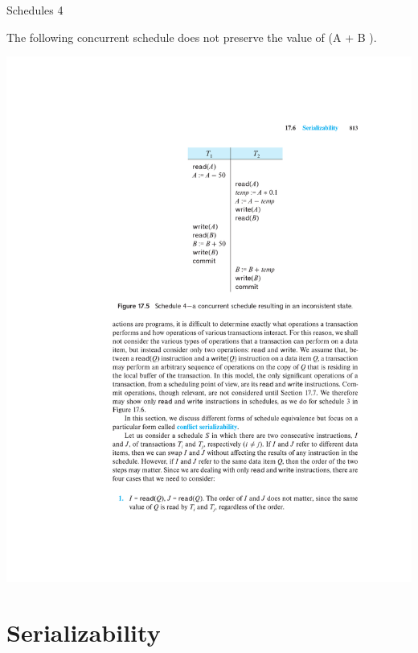 \documentclass{beamer}
\begin{document}
\begin{frame}{Schedules 4}

    The following concurrent schedule does not preserve the value of (A + B ).
    \begin{center}
        \includegraphics[width=\textwidth, trim={2cm 14.25cm 2cm 4cm}, clip]{figures/p842_schedule4}
    \end{center}

\end{frame}


\section{Serializability}
\end{document}
